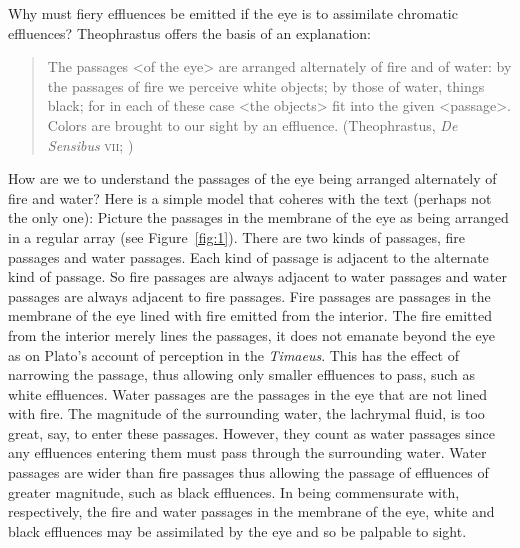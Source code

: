 Why must fiery effluences be emitted if the eye is to assimilate chromatic effluences? Theophrastus offers the basis of an explanation:
\begin{quote}
	The passages <of the eye> are arranged alternately of fire and of water: by the passages of fire we perceive white objects; by those of water, things black; for in each of these case <the objects> fit into the given <passage>. Colors are brought to our sight by an effluence. (Theophrastus, \emph{De Sensibus} \textsc{vii}; \citealt[71--73]{Stratton:1917vn})
\end{quote}
How are we to understand the passages of the eye being arranged alternately of fire and water? Here is a simple model that coheres with the text (perhaps not the only one): Picture the passages in the membrane of the eye as being arranged in a regular array (see Figure~\ref{fig:1}). There are two kinds of passages, fire passages and water passages. Each kind of passage is adjacent to the alternate kind of passage. So fire passages are always adjacent to water passages and water passages are always adjacent to fire passages. Fire passages are passages in the membrane of the eye lined with fire emitted from the interior. The fire emitted from the interior merely lines the passages, it does not emanate beyond the eye as on Plato's account of perception in the \emph{Timaeus}. This has the effect of narrowing the passage, thus allowing only smaller effluences to pass, such as white effluences. Water passages are the passages in the eye that are not lined with fire. The magnitude of the surrounding water, the lachrymal fluid, is too great, say, to enter these passages. However, they count as water passages since any effluences entering them must pass through the surrounding water. Water passages are wider than fire passages thus allowing the passage of effluences of greater magnitude, such as black effluences. In being commensurate with, respectively, the fire and water passages in the membrane of the eye, white and black effluences may be assimilated by the eye and so be palpable to sight. 

